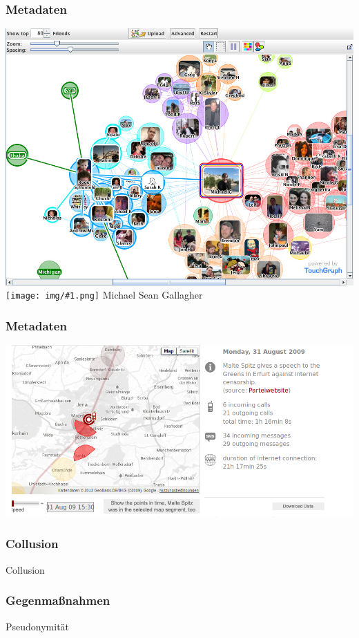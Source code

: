 \documentclass[12pt]{beamer}
\newcommand{\cc}[1]{\texttt{[image: img/\#1.png]}}
\begin{document}
\begin{frame}
    \frametitle{Metadaten}
    \includegraphics[height=0.7\textheight]{img/socialgraph.jpg}
    \cc{by-sa} Michael Sean Gallagher
\end{frame}

\begin{frame}
    \frametitle{Metadaten}
    \includegraphics[height=0.7\textheight]{img/maltespitz.png}
\end{frame}

\begin{frame}
    \frametitle{Collusion}
    \begin{center} \Large Collusion \end{center}
\end{frame}

\begin{frame}
    \frametitle{Gegenmaßnahmen}
    \begin{center} \Large Pseudonymität \end{center}
\end{frame}
\end{document}
